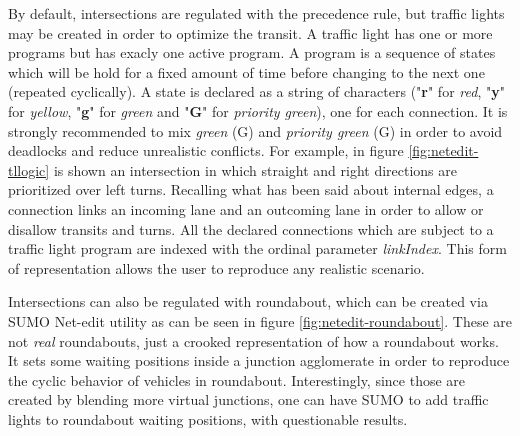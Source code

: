 
By default, intersections are regulated with the precedence rule, but traffic lights may be created in order to optimize the transit. A traffic light has one or more programs but has exacly one active program. A program is a sequence of states which will be hold for a fixed amount of time before changing to the next one (repeated cyclically). A state is declared as a string of characters ("\textbf{r}" for \textit{red}, "\textbf{y}" for \textit{yellow}, "\textbf{g}" for \textit{green} and "\textbf{G}" for \textit{priority green}), one for each connection. It is strongly recommended to mix \textit{green} (G) and \textit{priority green} (G) in order to avoid deadlocks and reduce unrealistic conflicts. For example, in figure \ref{fig:netedit-tllogic} is shown an intersection in which straight and right directions are prioritized over left turns. Recalling what has been said about internal edges, a connection links an incoming lane and an outcoming lane in order to allow or disallow transits and turns. All the declared connections which are subject to a traffic light program are indexed with the ordinal parameter \textit{linkIndex}. This form of representation allows the user to reproduce any realistic scenario.


Intersections can also be regulated with roundabout, which can be created via SUMO Net-edit utility as can be seen in figure \ref{fig:netedit-roundabout}. These are not \textit{real} roundabouts, just a crooked representation of how a roundabout works. It sets some waiting positions inside a junction agglomerate in order to reproduce the cyclic behavior of vehicles in roundabout.
Interestingly, since those are created by blending more virtual junctions, one can have SUMO to add traffic lights to roundabout waiting positions, with questionable results.


